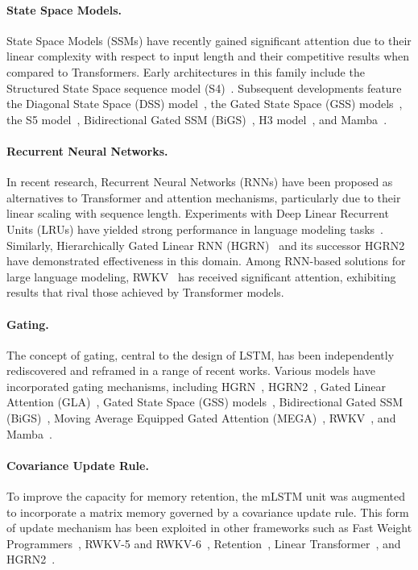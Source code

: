 \paragraph{State Space Models.} State Space Models (SSMs) have recently gained significant attention due to their linear complexity with respect to input length and their competitive results when compared to Transformers. Early architectures in this family include the Structured State Space sequence model (S4)~\citep{Gu:21}. Subsequent developments feature the Diagonal State Space (DSS) model~\citep{Gupta:22}, the Gated State Space (GSS) models~\citep{Mehta:22}, the S5 model~\citep{Smith:22}, Bidirectional Gated SSM (BiGS)~\citep{Wang:22}, H3 model~\citep{Fu:23}, and Mamba~\citep{Gu:24arxiv}.

\paragraph{Recurrent Neural Networks.} In recent research, Recurrent Neural Networks (RNNs) have been proposed as alternatives to Transformer and attention mechanisms, particularly due to their linear scaling with sequence length. Experiments with Deep Linear Recurrent Units (LRUs) have yielded strong performance in language modeling tasks~\citep{Orvieto:23, De:24arxiv}. Similarly, Hierarchically Gated Linear RNN (HGRN)~\citep{Qin:23} and its successor HGRN2~\citep{Qin:24arxiv} have demonstrated effectiveness in this domain. Among RNN-based solutions for large language modeling, RWKV~\citep{Peng:23arxivshort, Peng:24arxivshort} has received significant attention, exhibiting results that rival those achieved by Transformer models.

\paragraph{Gating.}
The concept of gating, central to the design of LSTM, has been independently rediscovered and reframed in a range of recent works. Various models have incorporated gating mechanisms, including HGRN~\citep{Qin:23}, HGRN2~\citep{Qin:24arxiv}, Gated Linear Attention (GLA)~\citep{Yang:23arxiv}, Gated State Space (GSS) models~\citep{Mehta:22}, Bidirectional Gated SSM (BiGS)~\citep{Wang:22}, Moving Average Equipped Gated Attention (MEGA)~\citep{Ma:22}, RWKV~\citep{Peng:23arxivshort}, and Mamba~\citep{Gu:24arxiv}.

\paragraph{Covariance Update Rule.}  
To improve the capacity for memory retention, the mLSTM unit was augmented to incorporate a matrix memory governed by a covariance update rule. This form of update mechanism has been exploited in other frameworks such as Fast Weight Programmers~\citep{Schmidhuber:92ncfastweights,Schlag:21}, RWKV-5 and RWKV-6~\citep{Peng:24arxivshort}, Retention~\citep{Sun:23arxiv}, Linear Transformer~\citep{Katharopoulos:20}, and HGRN2~\citep{Qin:24arxiv}.

